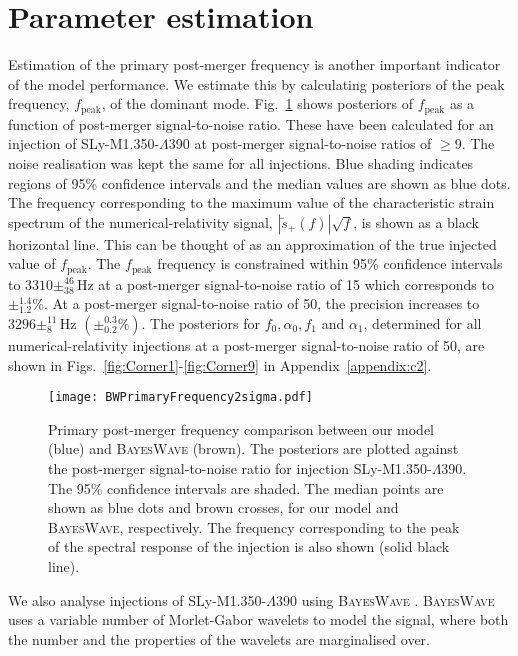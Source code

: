 \documentclass[../Thesis.tex]{subfiles}
\begin{document}
    
\section{Parameter  estimation}\label{sec:ParameterEstimation2}
    Estimation of the primary post-merger frequency is another important indicator of the model performance.
    We estimate this by calculating posteriors of the peak frequency, $f_{\mathrm{peak}}$, of the dominant mode.
    Fig.~\ref{fig:BWFREQvsSNR} shows posteriors of $f_{\mathrm{peak}}$ as a function of post-merger signal-to-noise ratio.
    These have been calculated for an injection of SLy-M1.350-$\Lambda$390 at post-merger signal-to-noise ratios  of $\ge 9$.
    The noise realisation was kept the same for all injections. 
    Blue shading indicates regions of 95\% confidence intervals and the median values are shown as blue dots.
    The frequency corresponding to the maximum value of the characteristic strain spectrum of the  numerical-relativity signal, $|\tilde{s}_+(f)|\sqrt{f}$, is shown as a black horizontal line.
    This can be thought of as an approximation of the true injected value of $f_{\mathrm{peak}}$.
    The $f_{\mathrm{peak}}$ frequency is constrained within 95\% confidence intervals to $3310\pm^{46}_{38}$\,Hz at a post-merger signal-to-noise ratio of 15 which corresponds to $\pm^{1.4}_{1.2}\%$.
    At a post-merger signal-to-noise ratio of 50, the precision increases to $3296\pm^{11}_{8}$\,Hz $(\pm^{0.3}_{0.2}\%)$.
    The posteriors for $f_0, \alpha_0, f_1$ and $\alpha_1$, determined for all numerical-relativity injections at a post-merger signal-to-noise ratio of 50, are shown in Figs.~\ref{fig:Corner1}-\ref{fig:Corner9} in Appendix~\ref{appendix:c2}.\par
   \begin{figure}[H]
         \centering
         \texttt{[image: BWPrimaryFrequency2sigma.pdf]}
         \caption{Primary post-merger frequency comparison between our model (blue) and \textsc{BayesWave} (brown). The posteriors are plotted against the post-merger signal-to-noise ratio for injection SLy-M1.350-$\Lambda$390. The 95\% confidence intervals are shaded. The median points are shown as blue dots and brown crosses, for our model and \textsc{BayesWave}, respectively. The frequency corresponding to the peak of the spectral response of the injection is also shown (solid black line).
         \label{fig:BWFREQvsSNR}}
     \end{figure}
    We also analyse injections of SLy-M1.350-$\Lambda$390 using \textsc{BayesWave} \cite{Cornish2015,Littenberg2015}. \textsc{BayesWave} uses a variable number of Morlet-Gabor wavelets to model the signal, where both the number and the properties of the wavelets are marginalised over.
\end{document}
